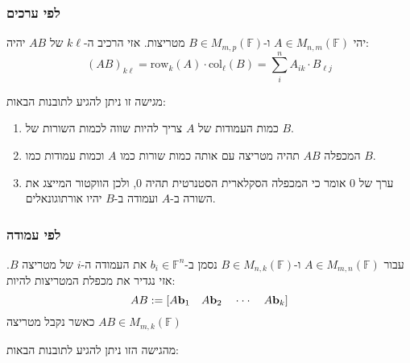 \documentclass{tstextbook}
\begin{document}
\subsubsection{לפי ערכים}

\begin{definition}
יהי \(A \in M_{n,m}\left( \mathbb{F}  \right)\) ו-\(B\in M_{m,p}\left( \mathbb{F}  \right)\) מטריצות. אזי הרכיב ה-\(k\ell\) של \(AB\) יהיה:
$$(AB)_{k\ell}=\mathrm{row}_{k}(A)\cdot \mathrm{col}_{\ell}(B)=\sum_{i}^{n} A_{ik}\cdot B_{\ell j}$$

\end{definition}
מגישה זו ניתן להגיע לתובנות הבאות:

\begin{enumerate}
  \item כמות העמודות של \(A\) צריך להיות שווה לכמות השורות של \(B\). 


  \item המכפלה \(AB\) תהיה מטריצה עם אותה כמות שורות כמו \(A\) וכמות עמודות כמו \(B\). 


  \item ערך של 0 אומר כי המכפלה הסקלארית הסטנרטית תהיה 0, ולכן הווקטור המייצג את השורה ב-\(A\) ועמודה ב-\(B\) יהיו אורתוגונאלים. 


\end{enumerate}
\subsubsection{לפי עמודה}

\begin{definition}
עבור \(A \in M_{m,n}\left( \mathbb{F}  \right)\) ו-\(B \in M_{n,k}\left( \mathbb{F}  \right)\) נסמן ב-\(b_{i}\in \mathbb{F} ^{n}\) את העמודה ה-\(i\) של מטריצה \(B\). אזי נגדיר את מכפלת המטריצות להיות:
$$A B:=\left[A{\bf b}_{1}\quad A{\bf b}_{2}\quad\cdot\cdot\cdot\quad A{\bf b}_{k}\right]$$
כאשר נקבל מטריצה \(AB \in M_{m,k}\left( \mathbb{F}  \right)\)

\end{definition}
מהגישה הזו ניתן להגיע לתובנות הבאות:
\end{document}

